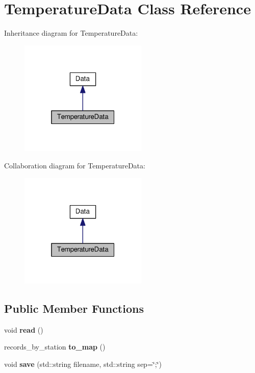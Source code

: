 \hypertarget{classTemperatureData}{}\section{Temperature\+Data Class Reference}
\label{classTemperatureData}


Inheritance diagram for Temperature\+Data\+:\nopagebreak
\begin{figure}[H]
\begin{center}
\leavevmode
\includegraphics[width=172pt]{classTemperatureData__inherit__graph}
\end{center}
\end{figure}


Collaboration diagram for Temperature\+Data\+:\nopagebreak
\begin{figure}[H]
\begin{center}
\leavevmode
\includegraphics[width=172pt]{classTemperatureData__coll__graph}
\end{center}
\end{figure}
\subsection*{Public Member Functions}
\begin{DoxyCompactItemize}
\item 
void {\bfseries read} ()\hypertarget{classTemperatureData_ac481b4de9ca185ac241f991d954c5794}{}\label{classTemperatureData_ac481b4de9ca185ac241f991d954c5794}

\item 
records\+\_\+by\+\_\+station {\bfseries to\+\_\+map} ()\hypertarget{classTemperatureData_af86f3b796d2b55220792e4b722a07026}{}\label{classTemperatureData_af86f3b796d2b55220792e4b722a07026}

\item 
void {\bfseries save} (std\+::string filename, std\+::string sep=\char`\"{};\char`\"{})\hypertarget{classTemperatureData_afd8010e49e41a3133167de9293ba8bc4}{}\label{classTemperatureData_afd8010e49e41a3133167de9293ba8bc4}

\end{DoxyCompactItemize}
